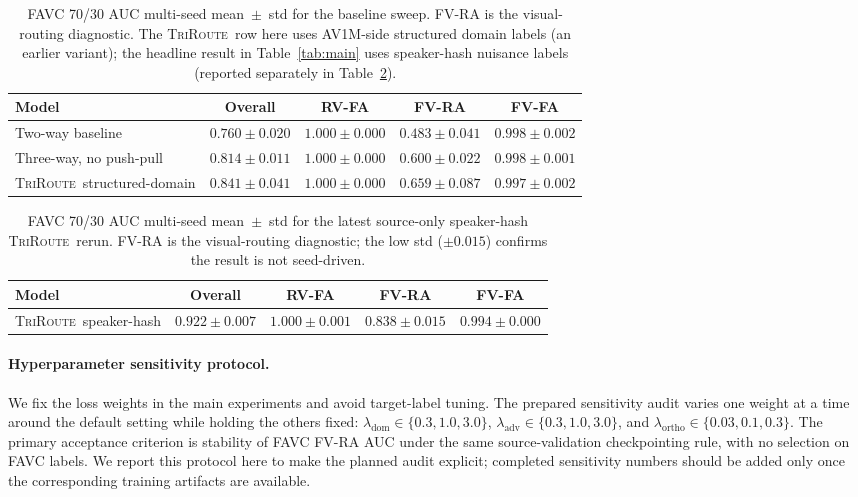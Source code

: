 \documentclass{article}
\newcommand{\method}{\textsc{TriRoute}}
\begin{document}
\begin{table}[h]
    \centering
    \caption{FAVC 70/30 AUC multi-seed mean~$\pm$~std for the baseline sweep. FV-RA is the visual-routing diagnostic. The \method\ row here uses AV1M-side structured domain labels (an earlier variant); the headline result in Table~\ref{tab:main} uses speaker-hash nuisance labels (reported separately in Table~\ref{tab:latest_seed_results}).}
    \label{tab:raw_seed_results}
    \small
    \begin{tabular}{lcccc}
        \toprule
        Model & Overall & RV-FA & \textbf{FV-RA} & FV-FA \\
        \midrule
        Two-way baseline & $0.760\pm0.020$ & $1.000\pm0.000$ & $\mathbf{0.483\pm0.041}$ & $0.998\pm0.002$ \\
        Three-way, no push-pull & $0.814\pm0.011$ & $1.000\pm0.000$ & $\mathbf{0.600\pm0.022}$ & $0.998\pm0.001$ \\
        \method\ structured-domain & $0.841\pm0.041$ & $1.000\pm0.000$ & $\mathbf{0.659\pm0.087}$ & $0.997\pm0.002$ \\
        \bottomrule
    \end{tabular}
\end{table}

\begin{table}[h]
    \centering
    \caption{FAVC 70/30 AUC multi-seed mean~$\pm$~std for the latest source-only speaker-hash \method\ rerun. FV-RA is the visual-routing diagnostic; the low std ($\pm0.015$) confirms the result is not seed-driven.}
    \label{tab:latest_seed_results}
    \small
    \begin{tabular}{lcccc}
        \toprule
        Model & Overall & RV-FA & \textbf{FV-RA} & FV-FA \\
        \midrule
        \method\ speaker-hash & $0.922\pm0.007$ & $1.000\pm0.001$ & $\mathbf{0.838\pm0.015}$ & $0.994\pm0.000$ \\
        \bottomrule
    \end{tabular}
\end{table}

\paragraph{Hyperparameter sensitivity protocol.}
We fix the loss weights in the main experiments and avoid target-label tuning. The prepared sensitivity audit varies one weight at a time around the default setting while holding the others fixed: $\lambda_{\mathrm{dom}}\in\{0.3,1.0,3.0\}$, $\lambda_{\mathrm{adv}}\in\{0.3,1.0,3.0\}$, and $\lambda_{\mathrm{ortho}}\in\{0.03,0.1,0.3\}$. The primary acceptance criterion is stability of FAVC FV-RA AUC under the same source-validation checkpointing rule, with no selection on FAVC labels. We report this protocol here to make the planned audit explicit; completed sensitivity numbers should be added only once the corresponding training artifacts are available.
\end{document}

